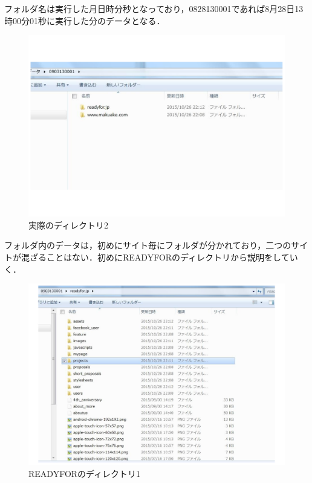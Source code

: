 フォルダ名は実行した月日時分秒となっており，0828130001であれば8月28日13時00分01秒に実行した分のデータとなる．
\begin{figure}[H]
\centering
\includegraphics[width=13cm]{figure33.pdf}
\caption{実際のディレクトリ2}\label{sannp}
\end{figure}

フォルダ内のデータは，初めにサイト毎にフォルダが分かれており，二つのサイトが混ざることはない．初めにREADYFORのディレクトリから説明をしていく．

\begin{figure}[H]
\centering
\includegraphics[width=13cm]{figure30.pdf}
\caption{READYFORのディレクトリ1}\label{sannp}
\end{figure}

